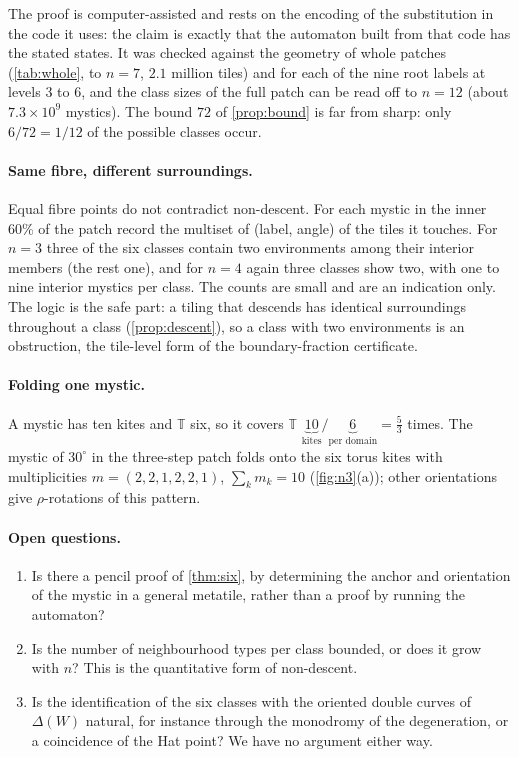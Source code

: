\documentclass[11pt,a4paper]{article}
\newcommand{\TT}{\mathbb{T}}
\theoremstyle{plain}
\theoremstyle{definition}
\begin{document}
The proof is computer-assisted and rests on the encoding of the substitution in the code
it uses: the claim is exactly that the automaton built from that code has the stated
states. It was checked against the geometry of whole patches (\cref{tab:whole}, to
$n=7$, $2.1$ million tiles) and for each of the nine root labels at levels $3$ to $6$,
and the class sizes of the full patch can be read off to $n=12$ (about $7.3\times10^9$
mystics). The bound $72$ of \cref{prop:bound} is far from sharp: only
$6/72=1/12$ of the possible classes occur.

\paragraph{Same fibre, different surroundings.} Equal fibre points do not
contradict non-descent. For each mystic in the inner $60\%$ of the patch record
the multiset of (label, angle) of the tiles it touches. For $n=3$ three of the six
classes contain two environments among their interior members (the rest one),
and for $n=4$ again three classes show two, with one to nine interior mystics per
class. The counts are small and are an indication only. The logic is the safe
part: a tiling that descends has identical surroundings throughout a class
(\cref{prop:descent}), so a class with two environments is an obstruction, the
tile-level form of the boundary-fraction certificate.

\paragraph{Folding one mystic.} A mystic has ten kites and $\TT$ six, so it covers
$\TT$ $\underbrace{10}_{\text{kites}}/\underbrace{6}_{\text{per domain}}=\tfrac53$
times. The mystic of $30^\circ$ in the three-step patch folds onto the six torus
kites with multiplicities $m=(2,2,1,2,2,1)$, $\sum_k m_k=10$
(\cref{fig:n3}(a)); other orientations give $\rho$-rotations of this pattern.

\paragraph{Open questions.}
\begin{footnotesize}
\begin{enumerate}[nosep]
\item Is there a pencil proof of \cref{thm:six}, by determining the anchor and
orientation of the mystic in a general metatile, rather than a proof by running the
automaton?
\item Is the number of neighbourhood types per class bounded, or does it grow with
$n$? This is the quantitative form of non-descent.
\item Is the identification of the six classes with the oriented double curves of
$\Delta(W)$ natural, for instance through the monodromy of the degeneration, or a
coincidence of the Hat point? We have no argument either way.
\end{enumerate}
\end{footnotesize}
\end{document}
